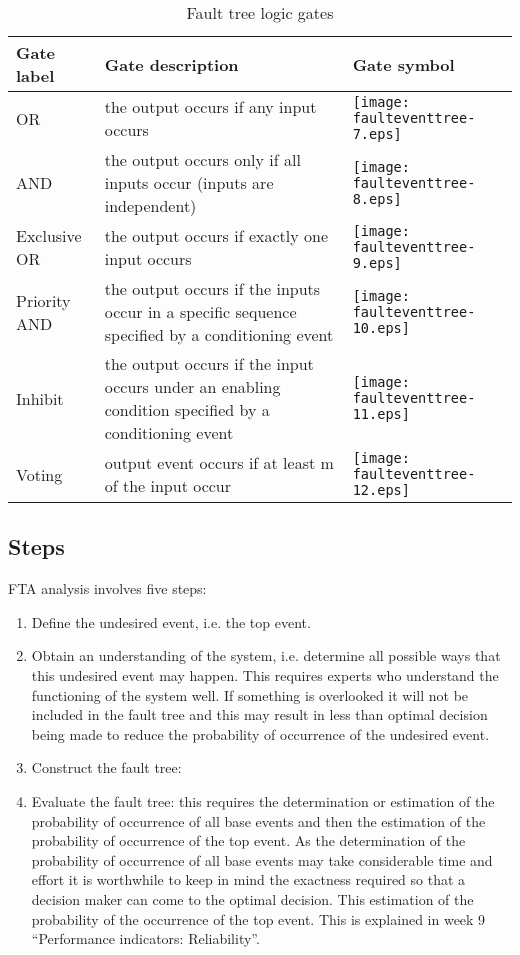 \begin{table}
\centering
\caption{Fault tree logic gates} \label{tbleventfault:10}
\begin{tabular}{|>{\centering\arraybackslash}m{2cm}|>{\raggedright\arraybackslash}m{3.5cm}|>{\centering\arraybackslash}m{2cm}|}
\hline
Gate label & Gate description & Gate symbol \\ 
\hline
OR & the output occurs if any input occurs & \texttt{[image: faulteventtree-7.eps]} \\ 
\hline
AND & the output occurs only if all inputs occur (inputs are independent) & \texttt{[image: faulteventtree-8.eps]} \\ 
\hline
Exclusive OR & the output occurs if exactly one input occurs & \texttt{[image: faulteventtree-9.eps]} \\ 
\hline
Priority AND & the output occurs if the inputs occur in a specific sequence specified by a conditioning event & \texttt{[image: faulteventtree-10.eps]} \\ 
\hline
Inhibit & the output occurs if the input occurs under an enabling condition specified by a conditioning event & \texttt{[image: faulteventtree-11.eps]} \\ 
\hline
Voting & output event occurs if at least m of the input occur & \texttt{[image: faulteventtree-12.eps]} \\ 
\hline
\end{tabular}
\end{table}
%
\subsection{Steps}
FTA analysis involves five steps:
\begin{enumerate}
\item Define the undesired event, i.e. the top event.
\item Obtain an understanding of the system, i.e. determine all possible ways that
this undesired event may happen. This requires experts who understand the
functioning of the system well. If something is overlooked it will not be
included in the fault tree and this may result in less than optimal decision
being made to reduce the probability of occurrence of the undesired event.
\item Construct the fault tree:
\item Evaluate the fault tree: this requires the determination or estimation of the
probability of occurrence of all base events and then the estimation of the
probability of occurrence of the top event. As the determination of the
probability of occurrence of all base events may take considerable time and
effort it is worthwhile to keep in mind the exactness required so that a decision
maker can come to the optimal decision. This estimation of the probability of the
occurrence of the top event. This is explained in week 9 ``Performance
indicators: Reliability''.
\end{enumerate}
